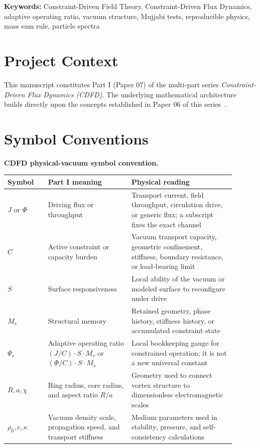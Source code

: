 \documentclass[11pt]{article}
\begin{document}
\noindent\textbf{Keywords:} Constraint-Driven Field Theory, Constraint-Driven Flux Dynamics, adaptive operating ratio, vacuum structure, Mujjabi tests, reproducible physics, mass sum rule, particle spectra

\vspace{0.75em}
\linenumbers

\section*{Project Context}
This manuscript constitutes Part I (Paper 07) of the multi-part series
\textit{Constraint-Driven Flux Dynamics (CDFD)}. The underlying mathematical
architecture builds directly upon the concepts established in Paper 06 of this
series~\cite{MujjabiVI2026}.

\section*{Symbol Conventions}

\noindent\textbf{CDFD physical-vacuum symbol convention.}
\begin{center}
{\small
\begin{tabular}{p{0.16\linewidth}p{0.33\linewidth}p{0.41\linewidth}}
\hline
Symbol & Part I meaning & Physical reading \\
\hline
$J$ or $\Phi$ & Driving flux or throughput & Transport current, field throughput, circulation drive, or generic flux; a subscript fixes the exact channel \\
$C$ & Active constraint or capacity burden & Vacuum transport capacity, geometric confinement, stiffness, boundary resistance, or load-bearing limit \\
$S$ & Surface responsiveness & Local ability of the vacuum or modeled surface to reconfigure under drive \\
$M_s$ & Structural memory & Retained geometry, phase history, stiffness history, or accumulated constraint state \\
$\Psi_s$ & Adaptive operating ratio $(J/C)\cdot S\cdot M_s$ or $(\Phi/C)\cdot S\cdot M_s$ & Local bookkeeping gauge for constrained operation; it is not a new universal constant \\
$R,a,\chi$ & Ring radius, core radius, and aspect ratio $R/a$ & Geometry used to connect vortex structure to dimensionless electromagnetic scales \\
$\rho_0,c,\kappa$ & Vacuum density scale, propagation speed, and transport stiffness & Medium parameters used in stability, pressure, and self-consistency calculations \\
\hline
\end{tabular}
}
\end{center}
\end{document}
